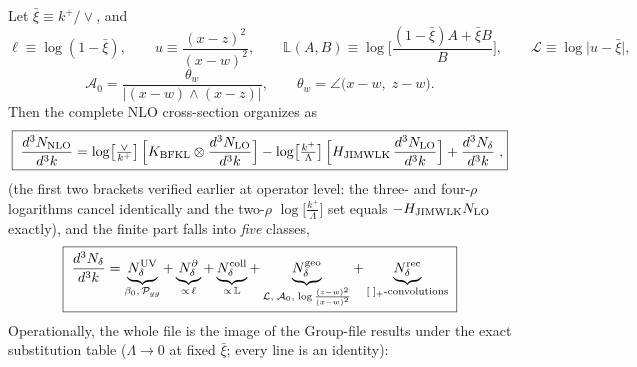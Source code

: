 \documentclass[11pt]{article}
\newcommand{\LB}{\log\!\big[\tfrac{\vee}{k^{+}}\big]}
\newcommand{\LJ}{\log\!\big[\tfrac{k^{+}}{\Lambda}\big]}
\newcommand{\xib}{\bar{\xi}}
\newcommand{\Azero}{\mathcal{A}_{0}}
\begin{document}
Let $\xib\equiv k^{+}/\vee$, and
\[
\ell\equiv\log(1-\xib),\qquad
u\equiv\frac{(x-z)^{2}}{(x-w)^{2}},\qquad
\mathbb L(A,B)\equiv\log\Big[\frac{(1-\xib)A+\xib B}{B}\Big],\qquad
\mathcal L\equiv\log\big|u-\xib\big| ,
\]
\[
\Azero=\frac{\theta_{w}}{\big|(x-w)\wedge(x-z)\big|},\qquad
\theta_{w}=\angle\big(x-w,\;z-w\big).
\]
Then the complete NLO cross-section organizes as
\begin{equation}
\boxed{\;
\frac{d^{3}N_{\rm NLO}}{d^{3}k}
=\LB\,\Big[K_{\rm BFKL}\otimes\frac{d^{3}N_{\rm LO}}{d^{3}k}\Big]
-\LJ\,\Big[H_{\rm JIMWLK}\,\frac{d^{3}N_{\rm LO}}{d^{3}k}\Big]
+\frac{d^{3}N_{\delta}}{d^{3}k}\;,}
\end{equation}
(the first two brackets verified earlier at operator level: the three- and four-$\rho$
logarithms cancel identically and the two-$\rho$ $\LJ$ set equals $-H_{\rm JIMWLK}N_{\rm LO}$
exactly), and the finite part falls into \emph{five} classes,
\begin{equation}
\boxed{\;
\frac{d^{3}N_{\delta}}{d^{3}k}
=\underbrace{N^{\rm UV}_{\delta}}_{\beta_{0},\,\mathcal P_{gg}}
+\underbrace{N^{\partial}_{\delta}}_{\propto\,\ell}
+\underbrace{N^{\rm coll}_{\delta}}_{\propto\,\mathbb L}
+\underbrace{N^{\rm geo}_{\delta}}_{\mathcal L,\;\Azero,\;\log\frac{(z-w)^{2}}{(x-w)^{2}}}
+\underbrace{N^{\rm rec}_{\delta}}_{[\;]_{+}\text{-convolutions}}\;}
\end{equation}
Operationally, the whole file is the image of the Group-file results under the exact
substitution table ($\Lambda\to0$ at fixed $\xib$; every line is an identity):
\end{document}
